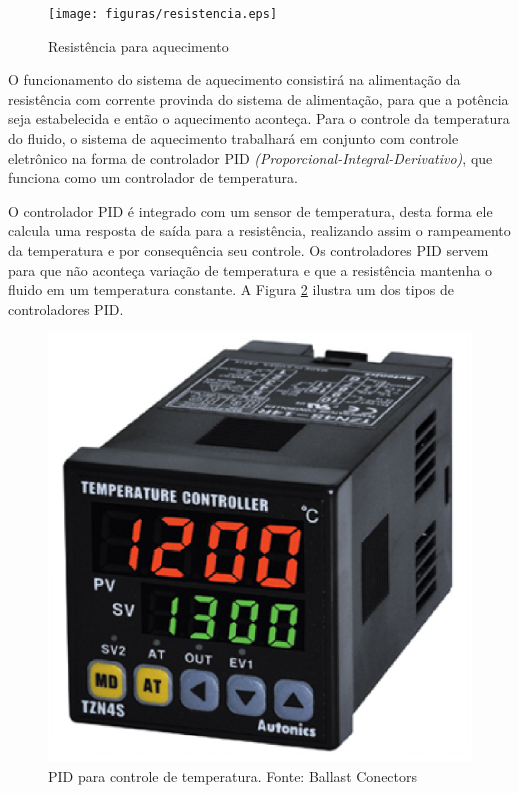 \begin{figure}[h]
	\centering
	\texttt{[image: figuras/resistencia.eps]}
	\caption{Resistência para aquecimento}
	\label{resistencia}
\end{figure}

O funcionamento do sistema de aquecimento consistirá na alimentação da resistência com corrente provinda do sistema de alimentação, para que a potência seja estabelecida e então o aquecimento aconteça. Para o controle da temperatura do fluido, o sistema de aquecimento trabalhará em conjunto com controle eletrônico na forma de controlador PID \textit{(Proporcional-Integral-Derivativo)}, que funciona como um controlador de temperatura.

 O controlador PID é integrado com um sensor de temperatura, desta forma ele calcula uma resposta de saída para a resistência, realizando assim o rampeamento da temperatura e por consequência seu controle. Os controladores PID servem para que não aconteça variação de temperatura e que a resistência mantenha o fluido em um temperatura constante. A Figura \ref{pid} ilustra um dos tipos de controladores PID.

 \begin{figure}[h]
 	\centering
 	\includegraphics[keepaspectratio=true,scale=0.3]{figuras/pid.eps}
 	\caption{PID para controle de temperatura. Fonte: Ballast Conectors}
 	\label{pid}
 \end{figure}

